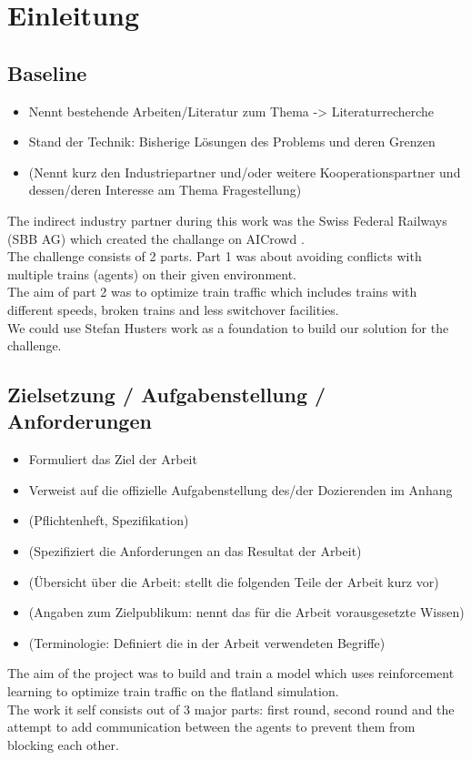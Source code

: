 \chapter{Einleitung}\label{chap.einleitung}


\section{Baseline}\label{baseline}

\begin{itemize}
\item Nennt bestehende Arbeiten/Literatur zum Thema -> Literaturrecherche
\item Stand der Technik: Bisherige Lösungen des Problems und deren Grenzen
\item (Nennt kurz den Industriepartner und/oder weitere Kooperationspartner und dessen/deren Interesse am Thema Fragestellung)
\end{itemize}
The indirect industry partner during this work was the Swiss Federal Railways (SBB AG) which created the challange on AICrowd \cite{aicrowd}.\\
The challenge consists of 2 parts. Part 1 was about avoiding conflicts with multiple trains (agents) on their given environment. \\
The aim of part 2 was to optimize train traffic which includes trains with different speeds, broken trains and less switchover facilities.\\
We could use Stefan Husters work as a foundation to build our solution for the challenge.%



\section{Zielsetzung / Aufgabenstellung / Anforderungen}\label{zielsetzung}

\begin{itemize}
\item Formuliert das Ziel der Arbeit
\item Verweist auf die offizielle Aufgabenstellung des/der Dozierenden im Anhang
\item (Pflichtenheft, Spezifikation)
\item (Spezifiziert die Anforderungen an das Resultat der Arbeit)
\item (Übersicht über die Arbeit: stellt die folgenden Teile der Arbeit kurz vor)
\item (Angaben zum Zielpublikum: nennt das für die Arbeit vorausgesetzte Wissen)
\item (Terminologie: Definiert die in der Arbeit verwendeten Begriffe)
\end{itemize}
The aim of the project was to build and train a model which uses reinforcement learning to optimize train traffic on the flatland simulation.\\
The work it self consists out of 3 major parts: first round, second round and the attempt to add communication between the agents to prevent them from blocking each other. \\

